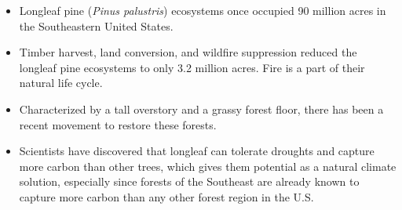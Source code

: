 \documentclass[oneside,a4paper,11pt,explicit]{book}
\begin{document}
\begin{tcolorbox}[colback=yellow!5!white,colframe=IceCreamLeaf,title=\textbf{Southern Pine Forests}]
\begin{multicols}{2}
	\columnbreak
		\begin{itemize}
			\item Longleaf pine (\textit{Pinus palustris}) ecosystems once occupied 90 million acres in the Southeastern United States.
			\item Timber harvest, land conversion, and wildfire suppression reduced the longleaf pine ecosystems to only 3.2 million acres. Fire is a part of their natural life cycle.
			\item Characterized by a tall overstory and a grassy forest floor, there has been a recent movement to restore these forests.
			\item Scientists have discovered that longleaf can tolerate droughts and capture more carbon than other trees, which gives them potential as a natural climate solution, especially since forests of the Southeast are already known to capture more carbon than any other forest region in the U.S.
		\end{itemize}
	\end{multicols}
\end{tcolorbox}
\end{document}
